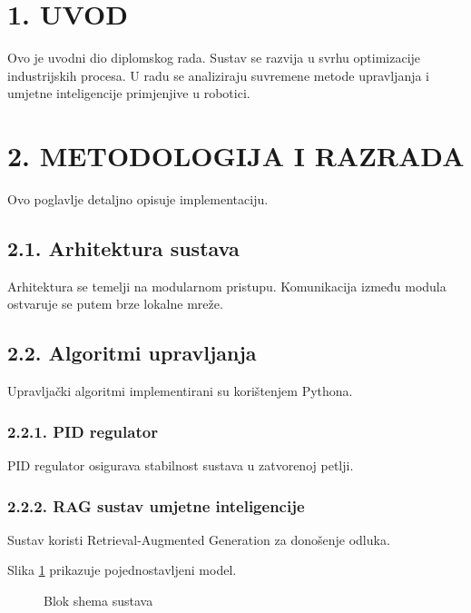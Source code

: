 \documentclass[12pt,a4paper]{article}
\begin{document}
\tableofcontents
\newpage
\listoffigures
\newpage
\listoftables
\newpage
{}

\section{1. UVOD}
Ovo je uvodni dio diplomskog rada. Sustav se razvija u svrhu optimizacije industrijskih procesa. U radu se analiziraju suvremene metode upravljanja i umjetne inteligencije primjenjive u robotici.

\section{2. METODOLOGIJA I RAZRADA}
Ovo poglavlje detaljno opisuje implementaciju.

\subsection{2.1. Arhitektura sustava}
Arhitektura se temelji na modularnom pristupu. Komunikacija između modula ostvaruje se putem brze lokalne mreže.

\subsection{2.2. Algoritmi upravljanja}
Upravljački algoritmi implementirani su korištenjem Pythona.

\subsubsection{2.2.1. PID regulator}
PID regulator osigurava stabilnost sustava u zatvorenoj petlji.

\subsubsection{2.2.2. RAG sustav umjetne inteligencije}
Sustav koristi Retrieval-Augmented Generation za donošenje odluka.

Slika \ref{fig:dummy} prikazuje pojednostavljeni model.
\begin{figure}[h]
    \centering
    \caption{Blok shema sustava}
    \label{fig:dummy}
\end{figure}
\end{document}
